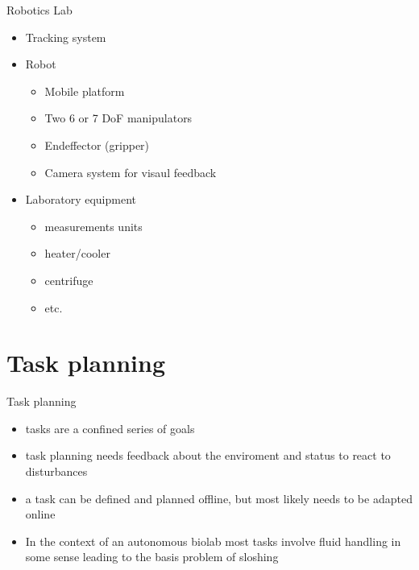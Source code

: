 \documentclass[de]{sdqbeamer}
\begin{document}

\begin{frame}{Robotics Lab}
    \begin{itemize}
        \item Tracking system 
        \item Robot
        \begin{itemize}
            \item Mobile platform
            \item Two 6 or 7 DoF manipulators
            \item Endeffector (gripper)
            \item Camera system for visaul feedback 
        \end{itemize}
        \item Laboratory equipment
        \begin{itemize}
            \item measurements units
            \item heater/cooler
            \item centrifuge
            \item etc.
        \end{itemize}
    \end{itemize}        
\end{frame}


\section{Task planning}
\begin{frame}{Task planning}
    \begin{itemize}
        \item tasks are a confined series of goals
        \item task planning needs feedback about the enviroment and status to react to disturbances
        \item a task can be defined and planned offline, but most likely needs to be adapted online
        \item In the context of an autonomous biolab most tasks involve fluid handling in some sense leading to the basis problem of sloshing
    \end{itemize}
\end{frame}
\end{document}
